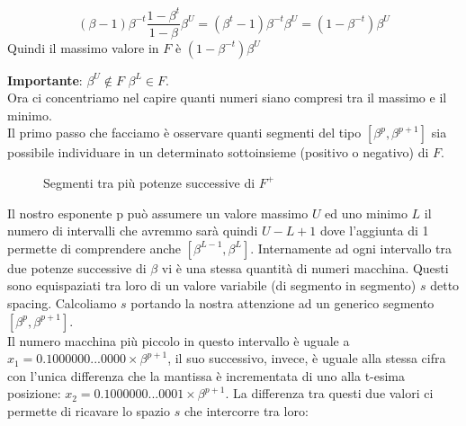 \documentclass[12pt, a4paper]{book}
\theoremstyle{definition}
\begin{document}
\begin{flushleft}
\begin{itemize}
\[ (\beta -1) \beta^{-t}\frac{1-\beta^{t}}{1-\beta}\beta^{U} = (\beta^{t} - 1)\beta^{-t}\beta^{U} = (1-\beta^{-t})\beta^{U}\]
Quindi il massimo valore in $F$ è $(1-\beta^{-t})\beta^{U}$ 
\end{itemize}
\textbf{Importante}: $\beta^{U} \notin F$ $\beta^{L} \in F$.\\
\vspace{1em}
Ora ci concentriamo nel capire quanti numeri siano compresi tra il massimo e il minimo. \\
Il primo passo che facciamo è osservare quanti segmenti del tipo $[\beta^{p}, \beta^{p+1}]$ sia possibile individuare in un determinato sottoinsieme (positivo o negativo) di $F$. 

\begin{figure}[h!]
\centering
{}
\caption{Segmenti tra più potenze successive di $F^{+}$}
\label{segmenti tra potenze successive}
\end{figure}

Il nostro esponente p può assumere un valore massimo $U$ ed uno minimo $L$ il numero di intervalli che avremmo sarà quindi $U-L+1$ dove l'aggiunta di 1 permette di comprendere anche $[\beta^{L-1}, \beta^{L}]$.
\vspace{1em}
Internamente ad ogni intervallo tra due potenze successive di $\beta$ vi è una stessa quantità di numeri macchina.  Questi sono equispaziati tra loro di un valore variabile (di segmento in segmento) $s$ detto spacing.
Calcoliamo $s$ portando la nostra attenzione ad un generico segmento $[\beta^{p}, \beta^{p+1}]$. \\
Il numero macchina più piccolo in questo intervallo è uguale a $x_{1} = 0.1000000...0000 \times \beta^{p+1}$, il suo successivo, invece,  è uguale alla stessa cifra con l'unica differenza che la mantissa è incrementata di uno alla t-esima posizione: $x_{2}=0.1000000...0001 \times \beta^{p+1}$. 
La differenza tra questi due valori ci permette di ricavare lo spazio $s$ che intercorre tra loro:


\end{flushleft}
\end{document}
